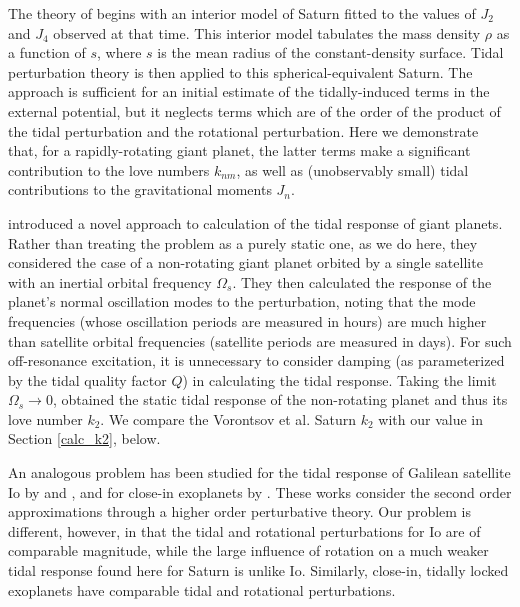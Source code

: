 The theory of \citet{gavrilov1977} begins with an interior model of Saturn fitted to
the values of $J_2$ and $J_4$ observed at that time.  This interior model tabulates
the mass density $\rho$ as a function of $s$, where $s$ is the mean radius of the
constant-density surface.  Tidal perturbation theory is then applied to this
spherical-equivalent Saturn.  The \citet{gavrilov1977} approach is sufficient for an
initial estimate of the tidally-induced terms in the external potential, but it
neglects terms which are of the order of the product of the tidal perturbation and
the rotational perturbation.  Here we demonstrate that, for a rapidly-rotating giant
planet, the latter terms make a significant contribution to the love numbers
$k_{nm}$, as well as (unobservably small) tidal contributions to the gravitational
moments $J_n$.

\citet{vorontsov1984} introduced a novel approach to calculation of the tidal
response of giant planets.  Rather than treating the problem as a purely static
one, as we do here, they considered the case of a non-rotating giant planet
orbited by a single satellite with an inertial orbital frequency $\Omega_s$.
They then calculated the response of the planet's normal oscillation modes to
the perturbation, noting that the mode frequencies (whose oscillation periods
are measured in hours) are much higher than satellite orbital frequencies
(satellite periods are measured in days). For such off-resonance excitation, it
is unnecessary to consider damping (as parameterized by the tidal quality
factor $Q$) in calculating the  tidal response.  Taking the limit
$\Omega_s \rightarrow 0$, \citet{vorontsov1984} obtained the static tidal
response of the non-rotating planet and thus its love number $k_2$.  We compare
the Vorontsov et al. Saturn $k_2$ with our value in Section \ref{calc_k2}, below.

An analogous problem has been studied for the tidal response of Galilean
satellite Io by \citet{zharkov2004} and \citet{zharkov2010}, and for close-in
exoplanets by \citet{correia2013}. These works consider the second order
approximations through a higher order perturbative theory. Our problem is
different, however, in that the tidal and rotational perturbations for Io are
of comparable magnitude, while the large influence of rotation on a much weaker
tidal response found here for Saturn is unlike Io.  Similarly, close-in,
tidally locked exoplanets have comparable tidal and rotational perturbations.

